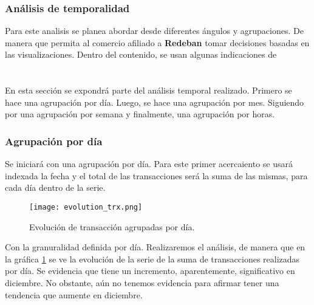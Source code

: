 \documentclass[a4paper]{article}
\begin{document}
\subsubsection{Análisis de temporalidad}

Para este analisis se planea abordar desde diferentes ángulos y agrupaciones. De manera que permita al comercio afiliado a \textbf{Redeban} tomar decisiones basadas en las visualizaciones. Dentro del contenido, se usan algunas indicaciones de \cite{BOOK:1}\\
\\

\\

En esta sección se expondrá parte del análisis temporal realizado. Primero se hace una agrupación por día. Luego, se hace una agrupación por mes. Siguiendo por una agrupación por semana y finalmente, una agrupación por horas.

\subsubsection*{Agrupación por día}

Se iniciará con una agrupación por día. Para este primer acercaiento se usará indexada la fecha y el total de las transacciones será la suma de las mismas, para cada día dentro de la serie.

\begin{figure}[h]
    \centering
	\texttt{[image: evolution\_trx.png]}
    \caption{Evolución de transacción agrupadas por día.}
    \label{fig:evolution_trx}
\end{figure}


Con la granuralidad definida por día. Realizaremos el análisis, de manera que en la gráfica \ref{fig:evolution_trx} se ve la evolución de la serie de la suma de transacciones realizadas por día. Se evidencia que tiene un incremento, aparentemente, significativo en diciembre. No obstante, aún no tenemos evidencia para afirmar tener una tendencia que aumente en diciembre.
\end{document}
